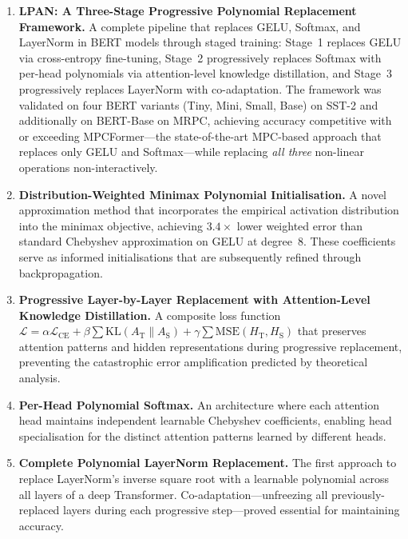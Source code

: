 \begin{enumerate}
    \item \textbf{LPAN: A Three-Stage Progressive Polynomial Replacement Framework.} A complete pipeline that replaces GELU, Softmax, and LayerNorm in BERT models through staged training: Stage~1 replaces GELU via cross-entropy fine-tuning, Stage~2 progressively replaces Softmax with per-head polynomials via attention-level knowledge distillation, and Stage~3 progressively replaces LayerNorm with co-adaptation. The framework was validated on four BERT variants (Tiny, Mini, Small, Base) on SST-2 and additionally on BERT-Base on MRPC, achieving accuracy competitive with or exceeding MPCFormer---the state-of-the-art MPC-based approach that replaces only GELU and Softmax---while replacing \emph{all three} non-linear operations non-interactively.

    \item \textbf{Distribution-Weighted Minimax Polynomial Initialisation.} A novel approximation method that incorporates the empirical activation distribution into the minimax objective, achieving $3.4\times$ lower weighted error than standard Chebyshev approximation on GELU at degree~8. These coefficients serve as informed initialisations that are subsequently refined through backpropagation.

    \item \textbf{Progressive Layer-by-Layer Replacement with Attention-Level Knowledge Distillation.} A composite loss function $\mathcal{L} = \alpha \mathcal{L}_{\mathrm{CE}} + \beta \sum \mathrm{KL}(A_{\mathrm{T}} \| A_{\mathrm{S}}) + \gamma \sum \mathrm{MSE}(H_{\mathrm{T}}, H_{\mathrm{S}})$ that preserves attention patterns and hidden representations during progressive replacement, preventing the catastrophic error amplification predicted by theoretical analysis.

    \item \textbf{Per-Head Polynomial Softmax.} An architecture where each attention head maintains independent learnable Chebyshev coefficients, enabling head specialisation for the distinct attention patterns learned by different heads.

    \item \textbf{Complete Polynomial LayerNorm Replacement.} The first approach to replace LayerNorm's inverse square root with a learnable polynomial across all layers of a deep Transformer. Co-adaptation---unfreezing all previously-replaced layers during each progressive step---proved essential for maintaining accuracy.


\end{enumerate}
